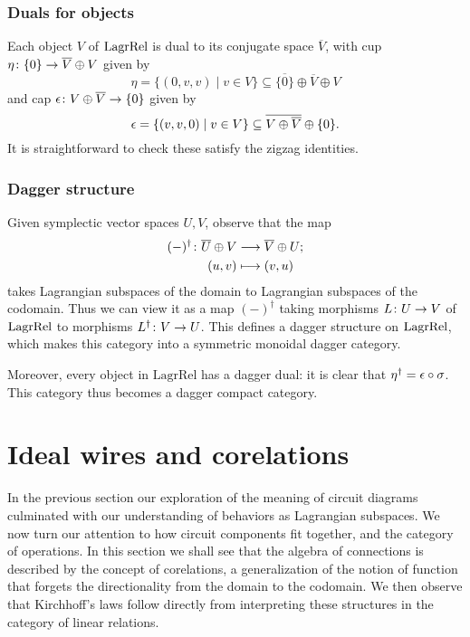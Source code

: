 \subsubsection*{Duals for objects}

Each object $V$ of $\mathrm{LagrRel}$ is dual to its conjugate space $\overline
V$, with cup $\eta{\colon} \{0\} \to \overline{V} \oplus V$ given by 
\[
  \eta = \{(0,v,v) \mid v \in V\} \subseteq \overline{\{0\}} \oplus \overline{V}
  \oplus V
\]
and cap $\epsilon{\colon} V \oplus \overline{V} \to \{0\}$ given by
\[
  \epsilon = \{(v,v,0) \mid v \in V\} \subseteq \overline{V \oplus \overline{V}}
  \oplus \{0\}.
\]
It is straightforward to check these satisfy the zigzag identities.

\subsubsection*{Dagger structure}

Given symplectic vector spaces $U,V$, observe that the map
\begin{align*}
  (-)^\dagger{\colon} \overline{U} \oplus V &\longrightarrow \overline{V} \oplus U; \\
  (u,v) &\longmapsto (v,u)
\end{align*} 
takes Lagrangian subspaces of the domain to Lagrangian subspaces of the
codomain. Thus we can view it as a map $(-)^\dagger$ taking morphisms $L{\colon} U \to V$
of $\mathrm{LagrRel}$ to morphisms $L^\dagger{\colon} V \to U$. This defines a
dagger structure on $\mathrm{LagrRel}$, which makes this category into a
symmetric monoidal dagger category.

Moreover, every object in $\mathrm{LagrRel}$ has a dagger dual: it is clear that
$\eta^\dagger = \epsilon \circ \sigma$.   This category thus becomes a dagger compact
category.

\section{Ideal wires and corelations} \label{sec:corel}
In the previous section our exploration of the meaning of circuit diagrams 
culminated with our understanding of behaviors as Lagrangian subspaces.  We now 
turn our attention to how circuit components fit together, and the category of 
operations.  In this section we shall see that the algebra of connections is 
described by the concept of corelations, a generalization of the notion of 
function that forgets the directionality from the domain to the codomain. We
then observe that Kirchhoff's laws follow directly from interpreting these
structures in the category of linear relations.

